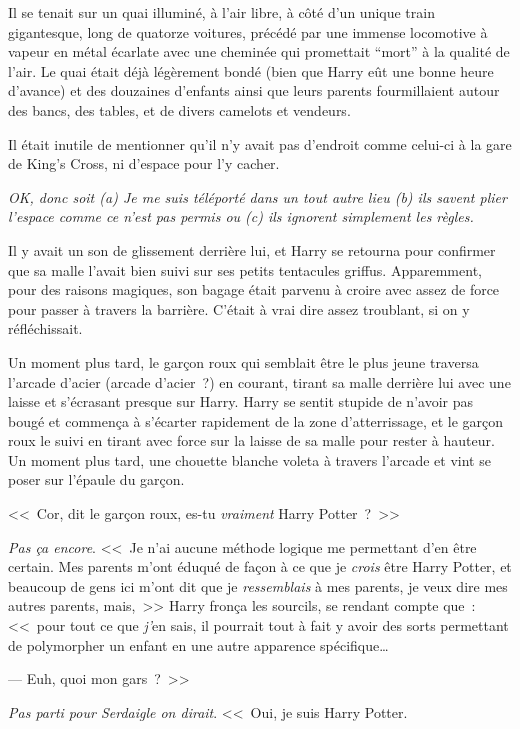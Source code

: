 Il se tenait sur un quai illuminé, à l'air libre, à côté d'un unique train gigantesque, long de quatorze voitures, précédé par une immense locomotive à vapeur en métal écarlate avec une cheminée qui promettait “mort” à la qualité de l'air. Le quai était déjà légèrement bondé (bien que Harry eût une bonne heure d'avance) et des douzaines d'enfants ainsi que leurs parents fourmillaient autour des bancs, des tables, et de divers camelots et vendeurs.

Il était inutile de mentionner qu'il n'y avait pas d'endroit comme celui-ci à la gare de King's Cross, ni d'espace pour l'y cacher.

\emph{OK, donc soit (a) Je me suis téléporté dans un tout autre lieu (b) ils savent plier l'espace comme ce n'est pas permis ou (c) ils ignorent simplement les règles.}

Il y avait un son de glissement derrière lui, et Harry se retourna pour confirmer que sa malle l'avait bien suivi sur ses petits tentacules griffus. Apparemment, pour des raisons magiques, son bagage était parvenu à croire avec assez de force pour passer à travers la barrière. C'était à vrai dire assez troublant, si on y réfléchissait.

Un moment plus tard, le garçon roux qui semblait être le plus jeune traversa l'arcade d'acier (arcade d'acier~?) en courant, tirant sa malle derrière lui avec une laisse et s'écrasant presque sur Harry. Harry se sentit stupide de n'avoir pas bougé et commença à s'écarter rapidement de la zone d'atterrissage, et le garçon roux le suivi en tirant avec force sur la laisse de sa malle pour rester à hauteur. Un moment plus tard, une chouette blanche voleta à travers l'arcade et vint se poser sur l'épaule du garçon.

<<~Cor, dit le garçon roux, es-tu \emph{vraiment} Harry Potter~?~>>

\emph{Pas ça encore}. <<~Je n'ai aucune méthode logique me permettant d'en être certain. Mes parents m'ont éduqué de façon à ce que je \emph{crois} être Harry Potter, et beaucoup de gens ici m'ont dit que je \emph{ressemblais} à mes parents, je veux dire mes autres parents, mais,~>> Harry fronça les sourcils, se rendant compte que~: <<~pour tout ce que \emph{j'}en sais, il pourrait tout à fait y avoir des sorts permettant de polymorpher un enfant en une autre apparence spécifique…

--- Euh, quoi mon gars~?~>>

\emph{Pas parti pour Serdaigle on dirait}. <<~Oui, je suis Harry Potter.

